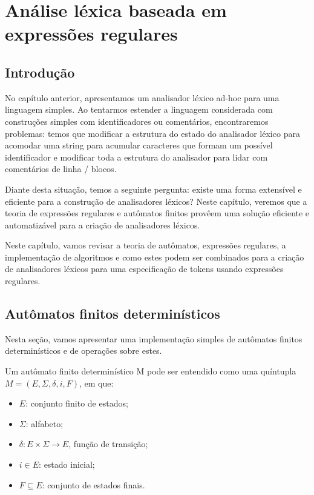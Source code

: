 \chapter{Análise léxica baseada em expressões regulares}

\section{Introdução}

No capítulo anterior, apresentamos um analisador léxico ad-hoc para
uma linguagem simples. Ao tentarmos estender a linguagem considerada
com construções simples com identificadores ou comentários,
encontraremos problemas: temos que modificar a estrutura do estado do
analisador léxico para acomodar uma string para acumular caracteres
que formam um possível identificador e modificar toda a estrutura do
analisador para lidar com comentários de linha / blocos.

Diante desta situação, temos a seguinte pergunta: existe uma forma
extensível e eficiente para a construção de analisadores léxicos?
Neste capítulo, veremos que a teoria de expressões regulares e
autômatos finitos provêem uma solução eficiente e automatizável para
a criação de analisadores léxicos.

Neste capítulo, vamos revisar a teoria de autômatos, expressões
regulares, a implementação de algoritmos e como estes podem ser
combinados para a criação de analisadores léxicos para uma
especificação de tokens usando expressões regulares.

\section{Autômatos finitos determinísticos}

Nesta seção, vamos apresentar uma implementação simples de autômatos
finitos determinísticos e de operações sobre estes.

\begin{Definition}
  Um autômato finito determinístico M pode ser entendido
  como uma quíntupla \(M = (E,\Sigma, \delta, i, F)\), em que:

  \begin{itemize}
    \item
      \(E\): conjunto finito de estados;
    \item
      \(\Sigma\): alfabeto;
    \item
      \(\delta : E \times \Sigma \to E\), função de transição;
    \item
      \(i \in E\): estado inicial;
    \item
      \(F \subseteq E\): conjunto de estados finais.
  \end{itemize}
\end{Definition}


